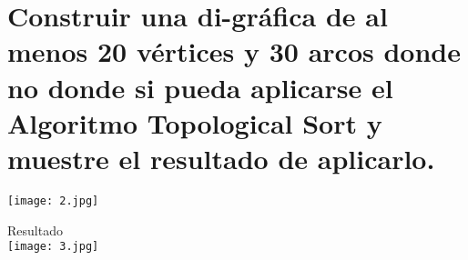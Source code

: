 \section{Construir una di-gráfica de al menos 20 vértices y 30 arcos donde no donde si pueda
aplicarse el Algoritmo Topological Sort y muestre el resultado de aplicarlo.}

\texttt{[image: 2.jpg]}

Resultado\\


\texttt{[image: 3.jpg]}


